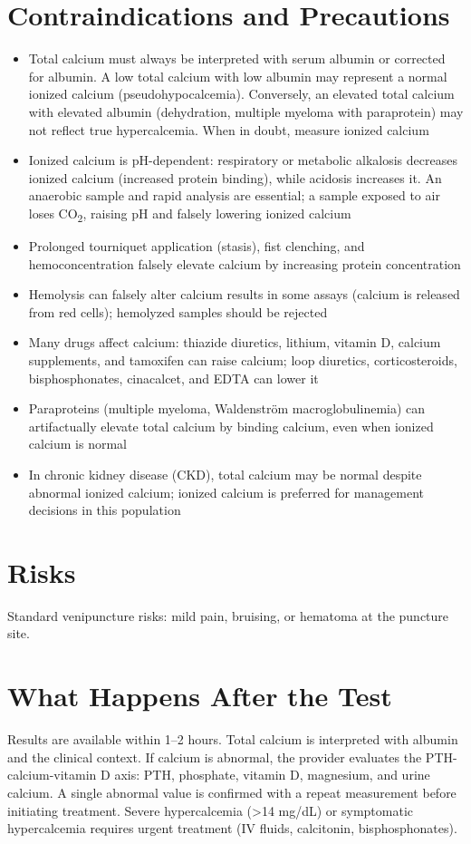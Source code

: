 \section*{Contraindications and Precautions}
\begin{itemize}
  \item Total calcium must always be interpreted with serum albumin or corrected for albumin. A low total calcium with low albumin may represent a normal ionized calcium (pseudohypocalcemia). Conversely, an elevated total calcium with elevated albumin (dehydration, multiple myeloma with paraprotein) may not reflect true hypercalcemia. When in doubt, measure ionized calcium
  \item Ionized calcium is pH-dependent: respiratory or metabolic alkalosis decreases ionized calcium (increased protein binding), while acidosis increases it. An anaerobic sample and rapid analysis are essential; a sample exposed to air loses CO\textsubscript{2}, raising pH and falsely lowering ionized calcium
  \item Prolonged tourniquet application (stasis), fist clenching, and hemoconcentration falsely elevate calcium by increasing protein concentration
  \item Hemolysis can falsely alter calcium results in some assays (calcium is released from red cells); hemolyzed samples should be rejected
  \item Many drugs affect calcium: thiazide diuretics, lithium, vitamin D, calcium supplements, and tamoxifen can raise calcium; loop diuretics, corticosteroids, bisphosphonates, cinacalcet, and EDTA can lower it
  \item Paraproteins (multiple myeloma, Waldenstr\"{o}m macroglobulinemia) can artifactually elevate total calcium by binding calcium, even when ionized calcium is normal
  \item In chronic kidney disease (CKD), total calcium may be normal despite abnormal ionized calcium; ionized calcium is preferred for management decisions in this population
\end{itemize}
\section*{Risks}
Standard venipuncture risks: mild pain, bruising, or hematoma at the puncture site.

\section*{What Happens After the Test}
Results are available within 1--2 hours. Total calcium is interpreted with albumin and the clinical context. If calcium is abnormal, the provider evaluates the PTH-calcium-vitamin D axis: PTH, phosphate, vitamin D, magnesium, and urine calcium. A single abnormal value is confirmed with a repeat measurement before initiating treatment. Severe hypercalcemia (>14 mg/dL) or symptomatic hypercalcemia requires urgent treatment (IV fluids, calcitonin, bisphosphonates).


